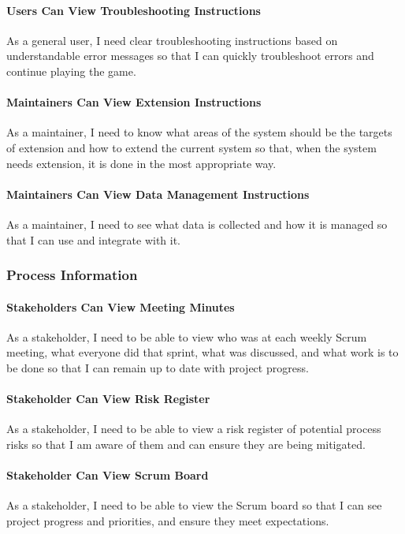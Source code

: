 \paragraph{Users Can View Troubleshooting Instructions}
As a general user, I need clear troubleshooting instructions based on understandable error messages so that I can quickly troubleshoot errors and continue playing the game.

\paragraph{Maintainers Can View Extension Instructions}
As a maintainer, I need to know what areas of the system should be the targets of extension and how to extend the current system so that, when the system needs extension, it is done in the most appropriate way.

\paragraph{Maintainers Can View Data Management Instructions}
As a maintainer, I need to see what data is collected and how it is managed so that I can use and integrate with it.

\subsubsection{Process Information}

\paragraph{Stakeholders Can View Meeting Minutes}
As a stakeholder, I need to be able to view who was at each weekly Scrum meeting, what everyone did that sprint, what was discussed, and what work is to be done so that I can remain up to date with project progress.

\paragraph{Stakeholder Can View Risk Register}
As a stakeholder, I need to be able to view a risk register of potential process risks so that I am aware of them and can ensure they are being mitigated.

\paragraph{Stakeholder Can View Scrum Board}
As a stakeholder, I need to be able to view the Scrum board so that I can see project progress and priorities, and ensure they meet expectations.

